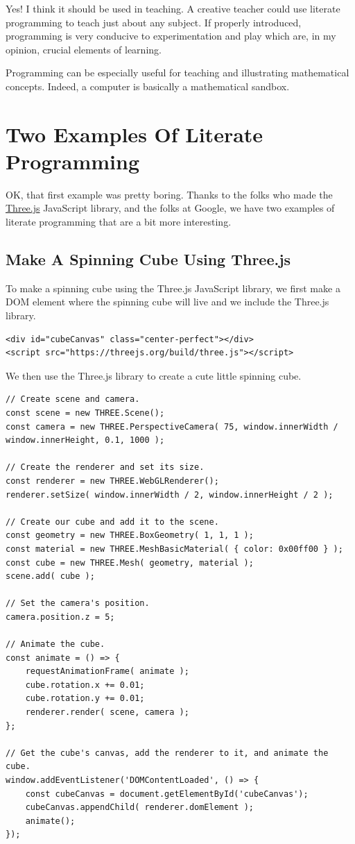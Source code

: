 \documentclass[11pt]{article}
\begin{document}
Yes! I think it should be used in teaching. A creative teacher could use
literate programming to teach just about any subject. If properly introduced,
programming is very conducive to experimentation and play which are, in my
opinion, crucial elements of learning.

Programming can be especially useful for teaching and illustrating mathematical
concepts. Indeed, a computer is basically a mathematical sandbox.

\section*{Two Examples Of Literate Programming}
\label{sec:orgee22196}

OK, that first example was pretty boring. Thanks to the folks who made the
\href{https://threejs.org/}{Three.js} JavaScript library, and the folks at Google, we have two examples of
literate programming that are a bit more interesting.

\subsection*{Make A Spinning Cube Using Three.js}
\label{sec:orgf7cbbf1}

To make a spinning cube using the Three.js JavaScript library, we first make a
DOM element where the spinning cube will live and we include the Three.js
library.

\begin{verbatim}
<div id="cubeCanvas" class="center-perfect"></div>
<script src="https://threejs.org/build/three.js"></script>
\end{verbatim}

We then use the Three.js library to create a cute little spinning cube.

\begin{verbatim}
// Create scene and camera.
const scene = new THREE.Scene();
const camera = new THREE.PerspectiveCamera( 75, window.innerWidth / window.innerHeight, 0.1, 1000 );

// Create the renderer and set its size.
const renderer = new THREE.WebGLRenderer();
renderer.setSize( window.innerWidth / 2, window.innerHeight / 2 );

// Create our cube and add it to the scene.
const geometry = new THREE.BoxGeometry( 1, 1, 1 );
const material = new THREE.MeshBasicMaterial( { color: 0x00ff00 } );
const cube = new THREE.Mesh( geometry, material );
scene.add( cube );

// Set the camera's position.
camera.position.z = 5;

// Animate the cube.
const animate = () => {
    requestAnimationFrame( animate );
    cube.rotation.x += 0.01;
    cube.rotation.y += 0.01;
    renderer.render( scene, camera );
};

// Get the cube's canvas, add the renderer to it, and animate the cube.
window.addEventListener('DOMContentLoaded', () => {
    const cubeCanvas = document.getElementById('cubeCanvas');
    cubeCanvas.appendChild( renderer.domElement );
    animate();
});
\end{verbatim}
\end{document}
